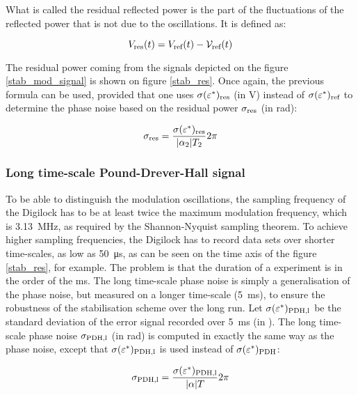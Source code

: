 What is called the residual reflected power is the part of the fluctuations of the reflected power that is not due to the oscillations. It is defined as:

\begin{equation}
	V_{\text{res}}(t) = V_{\text{ref}}(t) - \mathcal{V}_{\text{ref}}(t)
\end{equation}

The residual power coming from the signals depicted on the figure \ref{stab_mod_signal} is shown on figure \ref{stab_res}. Once again, the previous formula can be used, provided that one uses $\sigma(\varepsilon^*)_{\text{res}}$ (in \si{\volt}) instead of $\sigma(\varepsilon^*)_{\text{ref}}$ to determine the phase noise based on the residual power $\sigma_{\text{res}}$ (in \si{\radian}):

\begin{equation}
	\sigma_{\text{res}} = \frac{\sigma(\varepsilon^*)_{\text{res}}}{|\alpha_2|T_2}2\pi
\end{equation}


\subsubsection{Long time-scale Pound-Drever-Hall signal}

To be able to distinguish the modulation oscillations, the sampling frequency of the Digilock has to be at least twice the maximum \pdh modulation frequency, which is \SI{3.13}{\mega\hertz}, as required by the Shannon-Nyquist sampling theorem. To achieve higher sampling frequencies, the Digilock has to record data sets over shorter time-scales, as low as \SI{50}{\micro\second}, as can be seen on the time axis of the figure \ref{stab_res}, for example. The problem is that the duration of a \rcer experiment is in the order of the \si{\milli\second}. The long time-scale \pdh phase noise is simply a generalisation of the \pdh phase noise, but measured on a longer time-scale (\SI{5}{\milli\second}), to ensure the robustness of the stabilisation scheme over the long run. Let $\sigma(\varepsilon^*)_{\text{PDH,l}}$ be the standard deviation of the \pdh error signal recorded over \SI{5}{\milli\second} (in \si{\au}). The long time-scale \pdh phase noise $\sigma_{\text{PDH,l}}$ (in \si{\radian}) is computed in exactly the same way as the \pdh phase noise, except that $\sigma(\varepsilon^*)_{\text{PDH,l}}$ is used instead of $\sigma(\varepsilon^*)_{\text{PDH}}$:

\begin{equation}
	\sigma_{\text{PDH,l}} = \frac{\sigma(\varepsilon^*)_{\text{PDH,l}}}{|\alpha|T}2\pi
\end{equation}

